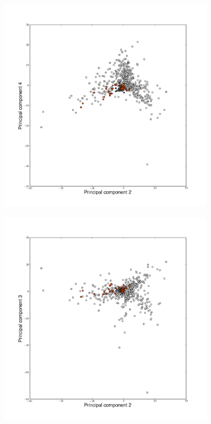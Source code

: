 \begin{landscape}
\begin{figure}
\begin{flushleft}
\begin{subfigure}[t]{0.42\textwidth}
	\end{subfigure}
	\begin{subfigure}[t]{0.42\textwidth}
	\includegraphics[width=1\textwidth]{./img/PCAncoor13.png}
	\end{subfigure}
	\begin{subfigure}[t]{0.42\textwidth}
	\includegraphics[width=1\textwidth]{./img/PCAncoor12.png}

\end{subfigure}
\end{flushleft}
\end{figure}
\end{landscape}
